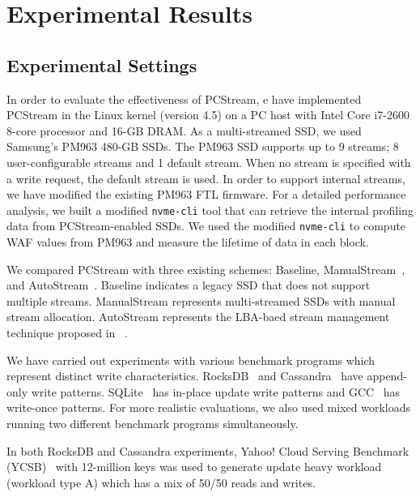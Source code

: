 \vspace{-10pt}
\section{Experimental Results}
\vspace{-5pt}
\subsection{Experimental Settings}
\vspace{-5pt}
In order to evaluate the effectiveness of \textsf{\small PCStream},
e have implemented  \textsf{\small PCStream} in the Linux kernel (version 4.5) 
on a PC host with Intel Core i7-2600 8-core processor and 16-GB DRAM.  
As a multi-streamed SSD, we used Samsung's PM963 480-GB SSDs.
The PM963 SSD supports up to 9 streams; 8
user-configurable streams and 1 default stream. 
When no stream is specified with a write request, the default stream is used.
In order to support internal streams, we have modified the existing PM963 FTL firmware.  
For a detailed performance analysis, we built a modified {\tt nvme-cli} tool that can 
retrieve the internal profiling data from PCStream-enabled SSDs.  
We used the modified {\tt nvme-cli} to compute WAF values from PM963 and 
measure the lifetime of data in each block. 

We compared \textsf{\small PCStream} with three
existing schemes: \textsf{\small Baseline}, \textsf{\small
ManualStream}~\cite{MultiStream}, and \textsf{\small
AutoStream}~\cite{AutoStream}.  \textsf{\small Baseline} indicates a legacy
SSD that does not support multiple streams. \textsf{\small ManualStream}
represents multi-streamed SSDs with manual stream allocation.  \textsf{\small
AutoStream} represents the LBA-baed stream management technique proposed
in ~\cite{AutoStream}. 


We have carried out experiments with various benchmark programs
which represent distinct write characteristics.
RocksDB~\cite{RocksDB} and Cassandra~\cite{Cassandra} have
append-only write patterns. SQLite~\cite{SQLite} has in-place update write patterns
and GCC~\cite{GCC} has write-once patterns.  
For more realistic evaluations, we also used mixed workloads running two 
different benchmark programs simultaneously.

In both RocksDB and Cassandra experiments, Yahoo! Cloud
Serving Benchmark (YCSB)~\cite{YCSB} with 12-million keys was used to
generate update heavy workload (workload type A) which has a mix of 50/50 reads and writes.

